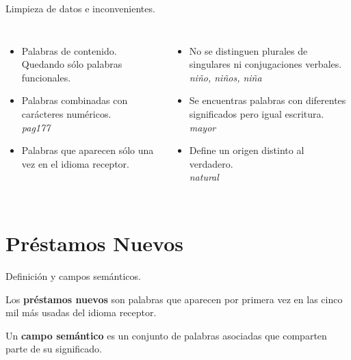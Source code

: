 \documentclass[10pt,xcolor={usenames,dvipsnames}]{beamer}
\begin{document}
\begin{frame}[fragile]{Limpieza de datos e inconvenientes.}
	\begin{columns}
		\begin{itemize}
			\item<1->[$\blacksquare$] Palabras de contenido. Quedando sólo palabras funcionales.
			\item<2->[$\blacksquare$] Palabras combinadas con carácteres numéricos.
			\\
			\centering\textcolor{Sepia}{\textit{pag177}}
			\item<3->[$\blacksquare$] Palabras que aparecen sólo una vez en el idioma receptor.
			
		\end{itemize}
		
		\begin{itemize}
			\item<4-6>[$\blacksquare$] No se distinguen plurales de singulares  ni conjugaciones verbales.
			\\
			\centering\textcolor{Sepia}{\textit{niño, niños, niña}}
			\item<5-6>[$\blacksquare$]Se encuentras palabras con diferentes significados pero igual escritura.
			\\
			\centering\textcolor{Sepia}{\textit{mayor}}
			\item<6>[$\blacksquare$]Define un origen distinto al verdadero.
			\\
			\centering\textcolor{Sepia}{\textit{natural}}
			
		\end{itemize}
		
	\end{columns}
\end{frame}

\section{Préstamos Nuevos}


\begin{frame}[fragile]{Definición y campos semánticos.}
	
	Los \textbf{préstamos nuevos} son palabras que aparecen por primera vez en las cinco mil más usadas del idioma receptor.
	
	Un \textbf{campo semántico} es un conjunto de palabras asociadas que comparten parte de su significado. 
\end{frame}
\end{document}
